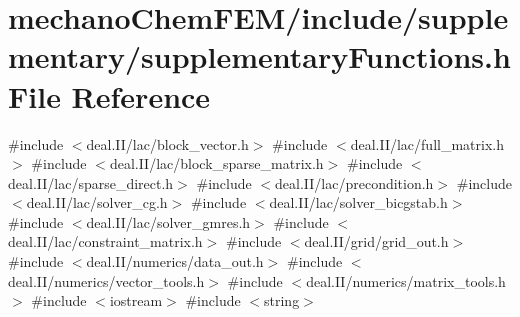 \section{mechano\+Chem\+F\+E\+M/include/supplementary/supplementary\+Functions.h File Reference}
\label{supplementary_functions_8h}
{\ttfamily \#include $<$deal.\+I\+I/lac/block\+\_\+vector.\+h$>$}\newline
{\ttfamily \#include $<$deal.\+I\+I/lac/full\+\_\+matrix.\+h$>$}\newline
{\ttfamily \#include $<$deal.\+I\+I/lac/block\+\_\+sparse\+\_\+matrix.\+h$>$}\newline
{\ttfamily \#include $<$deal.\+I\+I/lac/sparse\+\_\+direct.\+h$>$}\newline
{\ttfamily \#include $<$deal.\+I\+I/lac/precondition.\+h$>$}\newline
{\ttfamily \#include $<$deal.\+I\+I/lac/solver\+\_\+cg.\+h$>$}\newline
{\ttfamily \#include $<$deal.\+I\+I/lac/solver\+\_\+bicgstab.\+h$>$}\newline
{\ttfamily \#include $<$deal.\+I\+I/lac/solver\+\_\+gmres.\+h$>$}\newline
{\ttfamily \#include $<$deal.\+I\+I/lac/constraint\+\_\+matrix.\+h$>$}\newline
{\ttfamily \#include $<$deal.\+I\+I/grid/grid\+\_\+out.\+h$>$}\newline
{\ttfamily \#include $<$deal.\+I\+I/numerics/data\+\_\+out.\+h$>$}\newline
{\ttfamily \#include $<$deal.\+I\+I/numerics/vector\+\_\+tools.\+h$>$}\newline
{\ttfamily \#include $<$deal.\+I\+I/numerics/matrix\+\_\+tools.\+h$>$}\newline
{\ttfamily \#include $<$iostream$>$}\newline
{\ttfamily \#include $<$string$>$}\newline
